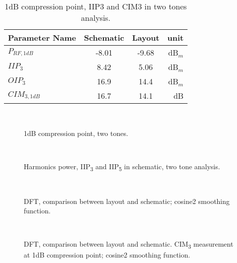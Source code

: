 \begin{table} [H]
	\label{tab:IIP3_2tone}
	\caption{1dB compression point, IIP3 and CIM3 in two tones analysis.}
	\centering	
	\begin{tabular}{lccr} 
		\toprule 
		Parameter Name			& Schematic 	& Layout & unit \\ 
		\midrule
		\(P_{RF,1dB}\) & -8.01 & -9.68 & dB\(_{m}\)\\
		\(IIP_{3}\)  & 8.42 & 5.06 & dB\(_{m}\) \\
		\(OIP_{3}\)  & 16.9 &14.4 & dB\(_{m}\) \\
		\(CIM_{3,1dB}\) & 16.7 & 14.1 & dB \\
		\bottomrule 
	\end{tabular}	
\end{table}

\begin{figure}[H] 
	\centering
	 \\
	\caption{1dB compression point, two tones.}
	\label{fig:1dB_2tones}
\end{figure}

\begin{figure}[H] 
	\centering
	 \\
	\caption{Harmonics power, IIP\textsubscript{3} and IIP\textsubscript{5} in schematic, two tone analysis.}
	\label{fig:IIP3_2t_schem}
\end{figure}

\begin{figure}[H] 
	\centering
	 \\
	\caption{DFT, comparison between layout and schematic; cosine2 smoothing function.}
	\label{fig:DFT_2ton}
\end{figure}

\begin{figure}[H] 
	\centering
	 \\
	\caption{DFT, comparison between layout and schematic. CIM\textsubscript{3} measurement at 1dB compression point; cosine2 smoothing function. }
	\label{fig:DFT_2ton_zoom}
\end{figure}
